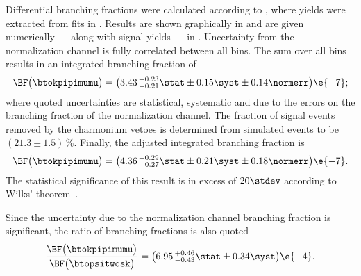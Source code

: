 Differential branching fractions were calculated according to , where yields
were extracted from fits in .
Results are shown graphically in  and are given numerically --- along
with signal yields --- in .
Uncertainty from the normalization channel is fully correlated between all \qsq bins.
The sum over all \qsq bins results in an integrated branching fraction of
\begin{equation*}
  \BF\big( \btokpipimumu \big)=
  \big(3.43\,^{+0.23}_{-0.21}\stat\pm0.15\syst\pm0.14\normerr\big)\e{-7};
\end{equation*}
where quoted uncertainties are statistical, systematic and due to the errors on the branching
fraction of the normalization channel.
The fraction of signal events removed by the charmonium vetoes is determined from simulated
 events %
to be $(21.3\pm1.5)\,\%$.
Finally, the adjusted integrated branching fraction is
\begin{equation*}
  \BF\big( \btokpipimumu \big)=
  \big(4.36\,^{+0.29}_{-0.27}\stat\pm0.21\syst\pm0.18\normerr\big)\e{-7}.
\end{equation*}
The statistical significance of this result is in excess of $20\stdev$ according to Wilks'
theorem~\cite{wilks1938}.

Since the uncertainty due to the normalization channel branching fraction is significant, the
ratio of branching fractions is also quoted
\begin{equation*}
  \frac{ \BF\big( \btokpipimumu \big) }{ \BF\big( \btopsitwosk \big) } =
  \big(6.95\,^{+0.46}_{-0.43}\stat\pm0.34\syst\big)\e{-4}.
\end{equation*}

